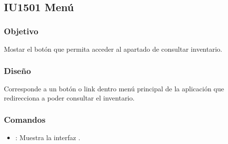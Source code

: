 \newpage
\subsection{IU1501 Menú }

\subsubsection{Objetivo}
	Mostar el botón que permita acceder al apartado de consultar inventario. 

\subsubsection{Diseño}
	Corresponde a un botón o link dentro menú principal de la aplicación que redirecciona a poder consultar el inventario. 


	

\subsubsection{Comandos}
\begin{itemize}
	\item {}: Muestra la interfaz .
\end{itemize}

